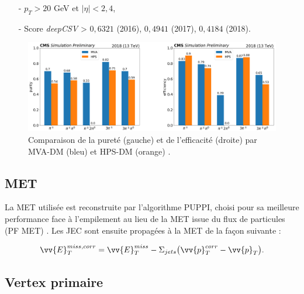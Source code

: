 \begin{itemize}
    \bigskip
    \item[-] $p_T>20$ GeV et $|\eta|<2,4$,
    \smallskip
    \item[-] Score \textit{deepCSV} > $0,6321$ (2016), $0,4941$ (2017), $0,4184$ (2018).
    \bigskip
\end{itemize}

\begin{figure}
\centering
    \includegraphics[scale=0.28]{Chapitre7/Images/purityvseffMVADM.png} 
    \caption{Comparaison de la pureté (gauche) et de l’efficacité (droite) par
MVA-DM (bleu) et HPS-DM (orange) \cite{mvadm}.}
    \label{purityMVADM}
\end{figure} 

\subsection{MET}
\label{MET}

La MET utilisée est reconstruite par l'algorithme PUPPI, choisi pour sa meilleure performance face à l'empilement au lieu de la MET issue du flux de particules (PF MET) \cite{puppi}. Les JEC sont ensuite propagées à la MET de la façon suivante :

$$\vv{E}^{miss,corr}_T=\vv{E}^{miss}_T-\Sigma_{jets}\bigl(\vv{p}_T^{corr}-\vv{p}_T\bigr).$$

\subsection{Vertex primaire}
\label{PVreco}

